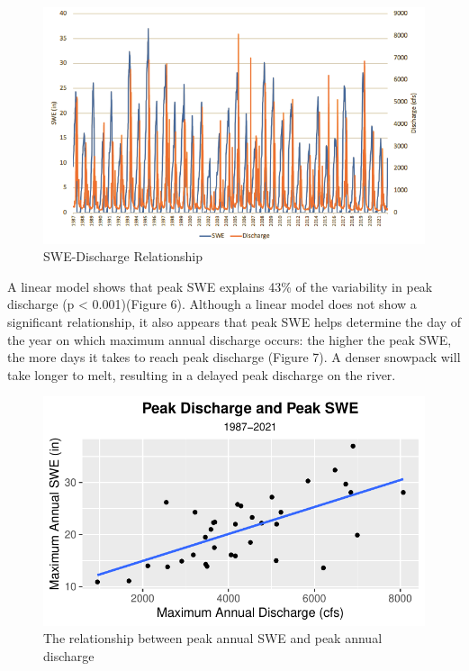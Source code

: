 \documentclass[
  12pt,
]{article}
\begin{document}
\begin{figure}
\centering
\includegraphics{snowpack_discharge_plot.png}
\caption{SWE-Discharge Relationship}
\end{figure}

A linear model shows that peak SWE explains 43\% of the variability in
peak discharge (p \textless{} 0.001)(Figure 6). Although a linear model
does not show a significant relationship, it also appears that peak SWE
helps determine the day of the year on which maximum annual discharge
occurs: the higher the peak SWE, the more days it takes to reach peak
discharge (Figure 7). A denser snowpack will take longer to melt,
resulting in a delayed peak discharge on the river.

\begin{figure}
\centering
\includegraphics{McLaughlin_WDA_Project_files/figure-latex/unnamed-chunk-5-1.pdf}
\caption{The relationship between peak annual SWE and peak annual
discharge}
\end{figure}
\end{document}
